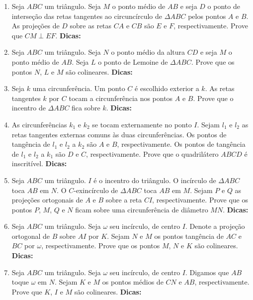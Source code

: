 \documentclass{article}
\newcommand{\dica}{\textbf{Dicas:}}
\newcommand{\iniTri}{Seja $ABC$ um triângulo}
\begin{document}
\begin{multicols}{2}
\begin{enumerate}
    \item \iniTri. Seja $M$ o ponto médio de $AB$ e seja $D$ o ponto de interseção das retas tangentes ao circuncírculo de $\Delta ABC$ pelos pontos $A$ e $B$. As projeções de $D$ sobre as retas $CA$ e $CB$ são $E$ e $F$, respectivamente. Prove que $CM\perp EF$. \dica %
    
    \item \iniTri. Seja $N$ o ponto médio da altura $CD$ e seja $M$ o ponto médio de $AB$. Seja $L$ o ponto de Lemoine de $\Delta ABC$. Prove que os pontos $N$, $L$ e $M$ são colineares. \dica %
    
    \item Seja $k$ uma circunferência. Um ponto $C$ é escolhido exterior a $k$. As retas tangentes $k$ por $C$ tocam a circunferência nos pontos $A$ e $B$. Prove que o incentro de $\Delta ABC$ fica sobre $k$. \dica %
    
    \item As circunferências $k_1$ e $k_2$ se tocam externamente no ponto $I$. Sejam $l_1$ e $l_2$ as retas tangentes externas comuns às duas circunferências. Os pontos de tangência de $l_1$ e $l_2$ a $k_2$ são $A$ e $B$, respectivamente. Os pontos de tangência de $l_1$ e $l_2$ a $k_1$ são $D$ e $C$, respectivamente. Prove que o quadrilátero $ABCD$ é inscritível. \dica %
    
    \item \iniTri. $I$ é o incentro do triângulo. O incírculo de $\Delta ABC$ toca $AB$ em $N$. O $C$-exincírculo de $\Delta ABC$ toca $AB$ em $M$. Sejam $P$ e $Q$ as projeções ortogonais de $A$ e $B$ sobre a reta $CI$, respectivamente. Prove que os pontos $P$, $M$, $Q$ e $N$ ficam sobre uma circunferência de diâmetro $MN$. \dica %
    
    \item \iniTri. Seja $\omega$ seu incírculo, de centro $I$. Denote a projeção ortogonal de $B$ sobre $AI$ por $K$. Sejam $N$ e $M$ os pontos tangência de $AC$ e $BC$ por $\omega$, respectivamente. Prove que os pontos $M$, $N$ e $K$ são colineares. \dica %
    
    \item \iniTri. Seja $\omega$ seu incírculo, de centro $I$. Digamos que $AB$ toque $\omega$ em $N$. Sejam $K$ e $M$ os pontos médios de $CN$ e $AB$, respectivamente. Prove que $K$, $I$ e $M$ são colineares. \dica %
    

\end{enumerate}
\end{multicols}
\end{document}
